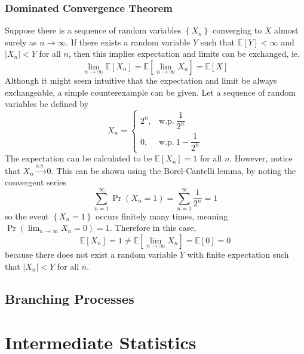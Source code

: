 \documentclass[11pt]{report} %
\begin{document}
\subsection{Dominated Convergence Theorem}

Suppose there is a sequence of random variables $\left\{X_{n}\right\}$ converging to $X$ almost surely as $n\to\infty$. If there exists a random variable $Y$ such that $\mathbb{E}\left[Y\right] < \infty$ and $\left|X_{n}\right| < Y$ for all $n$, then this implies expectation and limits can be exchanged, ie.
\begin{equation}
\lim_{n\to\infty}\mathbb{E}\left[X_{n}\right] = \mathbb{E}\left[\lim_{n\to\infty}X_{n}\right] = \mathbb{E}\left[X\right]
\end{equation}
Although it might seem intuitive that the expectation and limit be always exchangeable, a simple counterexample can be given. Let a sequence of random variables be defined by
\begin{equation}
X_{n} = \begin{cases} 2^{n}, & \mathrm{w.p.}\ \dfrac{1}{2^{n}} \\ 0, & \mathrm{w.p.}\ 1 - \dfrac{1}{2^{n}}\end{cases}
\end{equation}
The expectation can be calculated to be $\mathbb{E}\left[X_{n}\right] = 1$ for all $n$. However, notice that $X_{n} \overset{\mathrm{a.s.}}{\to} 0$. This can be shown using the Borel-Cantelli lemma, by noting the convergent series
\begin{equation}
\sum_{n = 1}^{\infty}\operatorname{Pr}\left(X_{n} = 1\right) = \sum_{n = 1}^{\infty}\dfrac{1}{2^{n}} = 1
\end{equation}
so the event $\left\{X_{n} = 1\right\}$ occurs finitely many times, meaning $\operatorname{Pr}\left(\lim_{n\to\infty}X_{n} = 0\right) = 1$. Therefore in this case,
\begin{equation}
\mathbb{E}\left[X_{n}\right] = 1 \neq \mathbb{E}\left[\lim_{n\to\infty}X_{n}\right] = \mathbb{E}\left[0\right] = 0
\end{equation}
because there does not exist a random variable $Y$ with finite expectation such that $\left|X_{n}\right| < Y$ for all $n$.

\section{Branching Processes}

\chapter{Intermediate Statistics}
\end{document}
